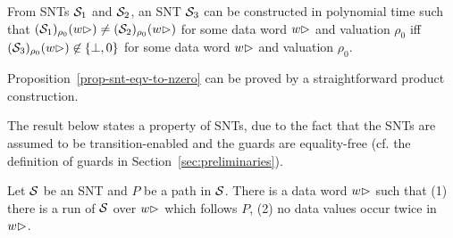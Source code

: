 \begin{proposition}\label{prop-snt-eqv-to-nzero}
From SNTs ${\mathcal{S} }_1$ and ${\mathcal{S} }_2$, an SNT ${\mathcal{S} }_3$ can be constructed in polynomial time such that  $({\mathcal{S} }_1)_{\rho_0}(w\rhd) \neq ({\mathcal{S} }_2)_{\rho_0}(w\rhd)$ for some  data word $w\rhd$ and valuation $\rho_0$  iff $({\mathcal{S} }_3)_{\rho_0}(w\rhd) \not\in \{\bot,0\}$ for some data word $w\rhd$ and valuation $\rho_0$. 
\end{proposition}
Proposition~\ref{prop-snt-eqv-to-nzero} can be proved by a straightforward product construction.

The result below states a property of SNTs, due to the fact that the SNTs are assumed to be transition-enabled and the guards are equality-free (cf. the definition of guards in Section~\ref{sec:preliminaries}).

\begin{proposition}\label{prop-snt-distinct-value}
Let ${\mathcal{S} }$ be an SNT and $P$ be a path in ${\mathcal{S} }$. There is a data word $w\rhd$ such that (1) there is a run of ${\mathcal{S} }$ over $w\rhd$ which follows $P$, (2) no data values occur twice in~$w\rhd$.
\end{proposition}



